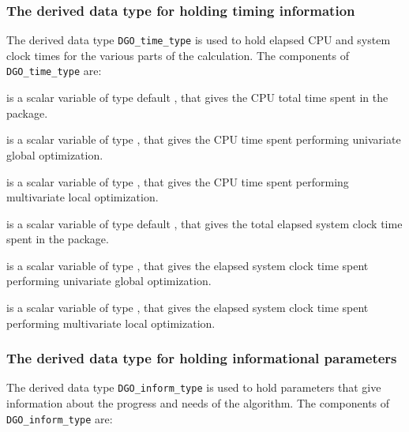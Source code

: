 \documentclass{galahad}
\newcommand{\packagename}{DGO}
\begin{document}
\subsubsection{The derived data type for holding timing
 information}\label{typetime}
The derived data type
{\tt \packagename\_time\_type}
is used to hold elapsed CPU and system clock times for the various parts
of the calculation. The components of
{\tt \packagename\_time\_type}
are:
\begin{description}
 is a scalar variable of type default \real, that gives
 the CPU total time spent in the package.

 is a scalar variable of type \realdp, that 
gives the CPU time spent performing univariate global optimization.

 is a scalar variable of type \realdp, that 
gives the CPU time spent performing multivariate local optimization.

 is a scalar variable of type default \real, that gives
 the total elapsed system clock time spent in the package.

 is a scalar variable of type \realdp, 
that gives the elapsed system clock time spent performing univariate global 
optimization.

 is a scalar variable of type \realdp, 
that gives the  elapsed system clock time spent performing multivariate local 
optimization.

\end{description}


\subsubsection{The derived data type for holding informational
 parameters}\label{typeinform}
The derived data type
{\tt \packagename\_inform\_type}
is used to hold parameters that give information about the progress and needs
of the algorithm. The components of
{\tt \packagename\_inform\_type}
are:
\end{document}
